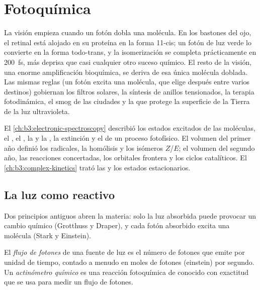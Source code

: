 \chapter{Fotoquímica}\label{ch:b3:photochemistry}

La visión empieza cuando un fotón dobla una molécula. En los bastones del ojo,
el retinal está alojado en su proteína en la forma 11-cis; un fotón de luz verde lo
convierte en la forma todo-trans, y la isomerización se completa prácticamente
en \qty{200}{fs}, más deprisa que casi cualquier otro suceso químico. El resto de la
visión, una enorme amplificación bioquímica, se deriva de esa única molécula
doblada. Las mismas reglas (un fotón excita una molécula, que elige después
entre varios destinos) gobiernan los filtros solares, la síntesis de anillos tensionados,
la terapia fotodinámica, el smog de las ciudades y la  que protege
la superficie de la Tierra de la luz ultravioleta.

\begin{recall}
El \cref{ch:b3:electronic-spectroscopy} describió los estados excitados de las
moléculas, el , el , la  y la
, la extinción y el  de un proceso fotofísico.
El volumen del primer año definió los radicales, la homólisis y los isómeros $Z$/$E$; el volumen del
segundo año, las reacciones concertadas, los orbitales frontera y los ciclos catalíticos.
El \cref{ch:b3:complex-kinetics} trató las  y los estados estacionarios.
\end{recall}

\section{La luz como reactivo}

Dos principios antiguos abren la materia: solo la luz absorbida puede provocar un
cambio químico (Grotthuss y Draper), y cada fotón absorbido excita una
molécula (Stark y Einstein).

\begin{definition}\label{def:b3:photochemistry:photon-flux}
El \emph{flujo de fotones} de una fuente de luz es el número de
fotones que emite por unidad de tiempo, contado a menudo en moles de fotones (einstein)
por segundo. Un \emph{actinómetro químico} es una
reacción fotoquímica de  conocido con exactitud que se usa para medir un
flujo de fotones.
\end{definition}

